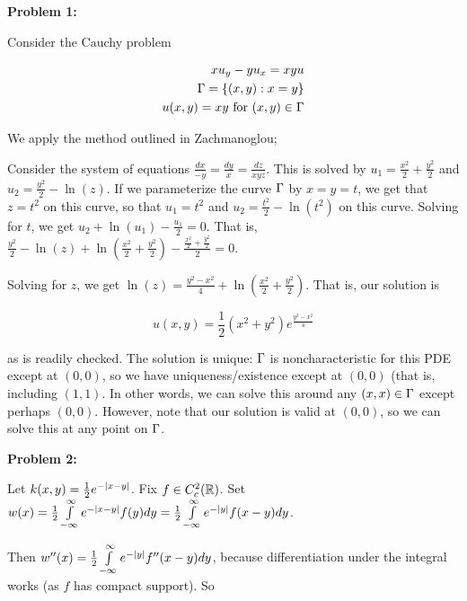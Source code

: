 \documentclass[a4paper,12pt]{article}
\begin{document}
{\bf Problem 1:}

Consider the Cauchy problem

\begin{align*}
xu_y-yu_x = xyu\\
\Gamma = \{(x,y): x=y\}\\
u(x,y) = xy \text{ for } (x,y) \in \Gamma
\end{align*}

We apply the method outlined in Zachmanoglou;

Consider the system of equations $\frac{dx}{-y}=\frac{dy}{x} = \frac{dz}{xyz}$. This is solved by $u_1=\frac{x^2}{2} + \frac{y^2}{2}$ and $u_2 = \frac{y^2}{2} - \ln(z)$. If we parameterize the curve $\Gamma$ by $x=y=t$, we get that $z=t^2$ on this curve, so that $u_1 = t^2$ and $u_2 = \frac{t^2}{2} - \ln(t^2)$ on this curve. Solving for $t$, we get $u_2 + \ln(u_1) - \frac{u_1}{2} =0$. That is, $\frac{y^2}{2} - \ln(z) + \ln(\frac{x^2}{2} + \frac{y^2}{2}) - \frac{\frac{x^2}{2} + \frac{y^2}{2}}{2} = 0$.

Solving for $z$, we get $\ln(z) = \frac{y^2-x^2}{4} +  \ln(\frac{x^2}{2} + \frac{y^2}{2}) $. That is, our solution is 

\begin{displaymath}
u(x,y) = \frac{1}{2} (x^2+y^2) e^{\frac{y^2-x^2}{4}}
\end{displaymath}

as is readily checked. The solution is unique: $\Gamma$ is noncharacteristic for this PDE except at $(0,0)$, so we have uniqueness/existence except at $(0,0)$ (that is, including $(1,1)$. In other words, we can solve this around any $(x,x) \in \Gamma$ except perhaps $(0,0)$. However, note that our solution is valid at $(0,0)$, so we can solve this at any point on $\Gamma$. 

\shunt

{\bf Problem 2:}

Let $k(x,y) = \frac{1}{2} e^{-\left\lvert x-y \right\rvert}$. Fix $f \in C^2_c(\mathbb{R})$. Set $w(x) = \frac{1}{2} \int\limits_{-\infty}^\infty e^{-\left\lvert x-y \right\rvert} f(y) dy = \frac{1}{2} \int\limits_{-\infty}^\infty e^{-\left\lvert y \right\rvert} f(x-y) dy$.

Then $w''(x) =  \frac{1}{2} \int\limits_{-\infty}^\infty e^{-\left\lvert y \right\rvert} f''(x-y) dy$, because differentiation under the integral works (as $f$ has compact support). So
\end{document}

